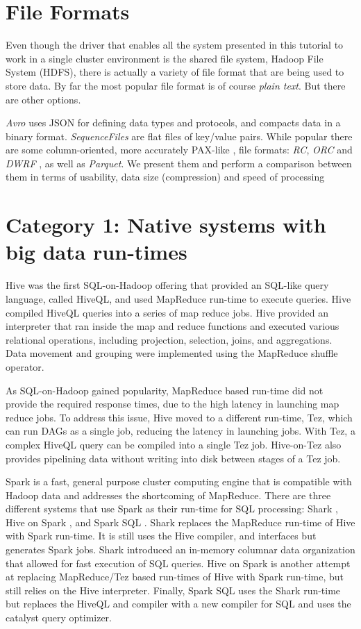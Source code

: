 \documentclass{vldb}
\begin{document}
\section{File Formats}

Even though the driver that enables all the system presented in this tutorial to work in a single cluster environment is the shared file system, Hadoop File System (HDFS), there is actually a variety of file format that are being used to store data. 
By far the most popular file format is of course {\em plain text}.
But there are other options.

{\em Avro} uses JSON for defining data types and protocols, and compacts data in a binary format. 
{\em SequenceFiles} are flat files of key/value pairs.
While popular there are some column-oriented, more accurately PAX-like \cite{AilamakiDHS01}, file formats: {\em RC}, {\em ORC} and {\em DWRF} \cite{dwrf}, as well as {\em Parquet}.
We present them and perform a comparison between them in terms of usability, data size (compression) and speed of processing

\section{Category 1: Native systems with big data run-times}

Hive \cite{hive} was the first SQL-on-Hadoop offering that provided an SQL-like query language, called HiveQL, and used MapReduce run-time to execute queries. Hive compiled HiveQL queries into a series of map reduce jobs. Hive provided an interpreter that ran inside the map and reduce functions and executed various relational operations, including projection, selection, joins, and aggregations. Data movement and grouping were implemented using the MapReduce shuffle operator.

As SQL-on-Hadoop gained popularity, MapReduce based run-time did not provide the required response times, due to the high latency in launching map reduce jobs. To address this issue, Hive moved to a different run-time, Tez, which can run DAGs as a single job, reducing the latency in launching jobs. With Tez, a complex HiveQL query can be compiled into a single Tez job. Hive-on-Tez also provides pipelining data without writing into disk between stages of a Tez job.

Spark is a fast, general purpose cluster computing engine that is compatible with Hadoop data and addresses the shortcoming of MapReduce. There are three different systems that use Spark as their run-time for SQL processing: Shark \cite{sharksigmod13}, Hive on Spark \cite{hiveOnSpark}, and Spark SQL \cite{sparkSQL}. Shark replaces the MapReduce run-time of Hive \cite{hive} with Spark run-time. It is still uses the Hive compiler, and interfaces but generates Spark jobs. Shark introduced an in-memory columnar data organization that allowed for fast execution of SQL queries. Hive on Spark is another attempt at replacing MapReduce/Tez based run-times of Hive with Spark run-time, but still relies on the Hive interpreter. Finally, Spark SQL uses the Shark \cite{sharksigmod13} run-time but replaces the HiveQL and compiler with a new compiler for SQL and uses the catalyst query optimizer.
\end{document}
